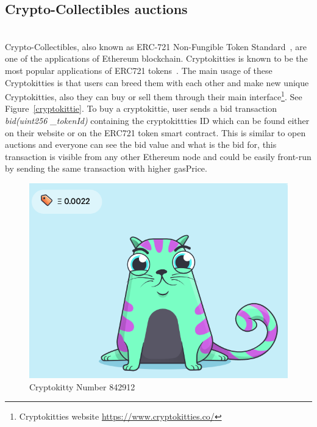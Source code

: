 

\subsection{Crypto-Collectibles auctions} \hfill\\ 
Crypto-Collectibles, also known as ERC-721 Non-Fungible Token Standard~\cite{erc721}, are one of the applications of Ethereum blockchain. Cryptokitties is known to be the most popular applications of ERC721 tokens~\cite{cryptokitties}. The main usage of these Cryptokitties is that users can breed them with each other and make new unique Cryptokitties, also they can buy or sell them through their main interface\footnote{Cryptokitties website \url{https://www.cryptokitties.co/}}. See Figure~\ref{cryptokittie}.
To buy a cryptokittie, user sends a bid transaction \textit{bid(uint256 \_tokenId)} containing the cryptokittties ID which can be found either on their website or on the ERC721 token smart contract. This is similar to open auctions and everyone can see the bid value and what is the bid for, this transaction is visible from any other Ethereum node and could be easily front-run by sending the same transaction with higher gasPrice. 

\begin{figure}[h]
\centering
\includegraphics[width=0.4\linewidth]{figures/cryptokittie842912.png}
\caption{ Cryptokitty Number 842912 \label{fig:cryptokittie}}
\end{figure}





